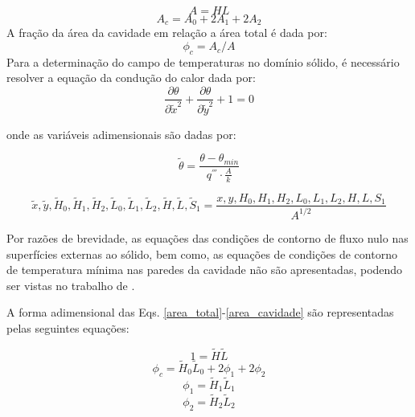\documentclass[12pt,A4,A4pt]{article}
\begin{document}
\begin{equation}
A = HL \label{area_total}
\end{equation}
\begin{equation}
A_{c} = A_{0} + 2A_{1} + 2A_{2} \label{area_cavidade}
\end{equation}
A fração da área da cavidade em relação a área total é dada por:
\begin{equation}
\phi_{c} = A_{c}/A \label{fi}
\end{equation}
Para a determinação do campo de temperaturas no domínio sólido, é necessário resolver a equação da condução do calor dada por:
\begin{equation}
\frac{\partial \theta}{\partial \tilde{x}^{2}}+\frac{\partial \theta}{\partial \tilde{y}^{2}}+1=0\label{calor}
\end{equation}

onde as variáveis adimensionais são dadas por:

\begin{equation}
\tilde{\theta} = \frac{\theta - \theta_{min}}{q^{'''}\cdot\frac{A}{k}}\label{tadim}
\end{equation}

\begin{equation}
\tilde{x},\tilde{y},\tilde{H}_{0},\tilde{H}_{1},\tilde{H}_{2},\tilde{L}_{0},\tilde{L}_{1},\tilde{L}_{2},\tilde{H},\tilde{L},\tilde{S}_{1} = \frac{x,y,H_{0},H_{1},H_{2},L_{0},L_{1},L_{2},H,L,S_{1}}{A^{1/2}}\label{vadim}
\end{equation}

Por razões de brevidade, as equações das condições de contorno de fluxo nulo nas superfícies externas ao sólido, bem como, as equações de condições de contorno de temperatura mínima nas paredes da cavidade não são apresentadas, podendo ser vistas no trabalho de  \cite{Gonzales2015cilamce}.

A forma adimensional das Eqs. \ref{area_total}-\ref{area_cavidade} são representadas pelas seguintes equações:

\begin{equation}
1  = \tilde{H}\tilde{L}\label{total_area_adim}
\end{equation}
\begin{equation}
\phi_{c}=\tilde{H}_{0}\tilde{L}_{0}+2\phi_{1}+2\phi_{2}\label{fi_c}
\end{equation}
\begin{equation}
\phi_{1}=\tilde{H}_{1}\tilde{L}_{1}\label{fi_1}
\end{equation}
\begin{equation}
\phi_{2}=\tilde{H}_{2}\tilde{L}_{2}\label{fi_2}
\end{equation}
\end{document}
